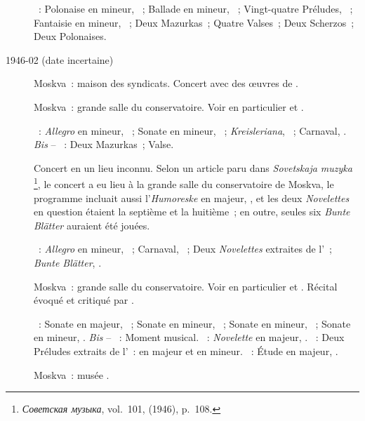 \begin{description}
 \textsc{\Chopin{}}~: Polonaise  en \kC mineur, 
 ~; Ballade  en \kG mineur, ~; Vingt-quatre
 Préludes, ~; Fantaisie en \kF mineur, ~; Deux Mazurkas~;
 Quatre Valses~; Deux Scherzos~; Deux Polonaises.
 \item[1946-02 (date incertaine)]
 Moskva~: maison des syndicats.
 Concert avec des œuvres de \Scriabine{}.
 \item[\DateWithWeekDay{1946-03-18}]
 Moskva~: grande salle du conservatoire.
 Voir en particulier \citet[p.~442]{Milshteyn82a} et
 \citet[p.~394]{Nikonovich08}.

 \textsc{\Schumann{}}~: \emph{Allegro} en \kB mineur, ~; Sonate en
 \kF \Sharp mineur, ~; \emph{Kreisleriana}, ~; Carnaval,
 .
 \emph{Bis} -- \textsc{\Chopin{}}~: Deux Mazurkas~; Valse.
 \item[\DateWithWeekDay{1946-04-04}]
 Concert en un lieu inconnu.
 Selon un article paru dans \emph{Sovetskaja muzyka}%
 \footnote{\foreignlanguage{russian}{\emph{Советская музыка}}, vol.~101,
  (1946), p.~108.},
 le concert a eu lieu à la grande salle du conservatoire de Moskva, le
 programme incluait aussi l'\emph{Humoreske} en \kB \Flat majeur, ,
 et les deux \emph{Novelettes} en question étaient la septième et la
 huitième~; en outre, seules six \emph{Bunte Blätter} auraient été jouées.

 \textsc{\Schumann{}}~: \emph{Allegro} en \kB mineur, ~; Carnaval,
 ~; Deux \emph{Novelettes} extraites de l'~; \emph{Bunte
 Blätter}, .
 \item[\DateWithWeekDay{1946-04-17}]
 Moskva~: grande salle du conservatoire.
 Voir en particulier \citet[p.~442]{Milshteyn82a} et
 \citet[p.~394]{Nikonovich08}.
 Récital évoqué et critiqué par \citet[p.~91]{Zitomirsky46}.

 \textsc{\Beethoven{}}~: Sonate en \kE \Flat majeur, ~; Sonate en
 \kF mineur, ~; Sonate en \kC \Sharp mineur,  ~;
 Sonate en \kC mineur, .
 \emph{Bis} -- \textsc{\Schubert{}}~: Moment musical.
 \textsc{\Schumann{}}~: \emph{Novelette} en \kE majeur, 
 .
 \textsc{\Chopin{}}~: Deux Préludes extraits de l'~:  en
 \kA majeur et  en \kF \Sharp mineur.
 \textsc{\Scriabine{}}~: Étude en \kD \Flat majeur,  .
 \item[\DateWithWeekDay{1946-04-28}]
 Moskva~: musée \Scriabine{}.


\end{description}
